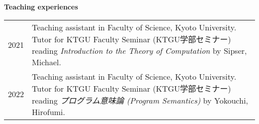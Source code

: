 \documentclass[a4paper,dvipsnames,11pt,backend=luatex]{article} %
\newcommand*{\cvsection}[1]{%
  \vspace{1.2\baselineskip}%
  {\raggedright          %
   \bfseries\large       %
   #1\par}               %
  \vspace{0.4\baselineskip}%
}
\begin{document}
\cvsection{Teaching experiences}
\begin{tabularx}{\textwidth}{@{}lp{140mm}}
  2021
  &
  Teaching assistant in Faculty of Science, Kyoto University.
  Tutor for KTGU Faculty Seminar (KTGU学部セミナー) reading \textit{Introduction to the Theory of Computation} by Sipser, Michael.
  \\
  2022
  &
  Teaching assistant in Faculty of Science, Kyoto University.
  Tutor for KTGU Faculty Seminar (KTGU学部セミナー) reading \textit{プログラム意味論 (Program Semantics) } by Yokouchi, Hirofumi.
\end{tabularx}
\end{document}
